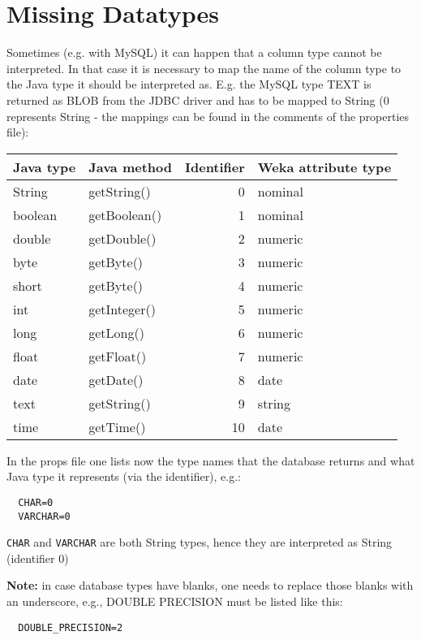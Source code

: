 \section{Missing Datatypes}
Sometimes (e.g. with MySQL) it can happen that a column type cannot be interpreted. In that case it is necessary to map the name of the column type to the Java type it should be interpreted as. E.g. the MySQL type TEXT is returned as BLOB from the JDBC driver and has to be mapped to String (0 represents String - the mappings can be found in the comments of the properties file):

\vspace{0.5cm}
\begin{tabular}{l|l|r|l}
Java type 	& Java method 	& Identifier 	& Weka attribute type \\
\hline
String		& getString() 	& 0	 	& nominal \\
boolean 	& getBoolean() 	& 1 		& nominal \\
double 		& getDouble() 	& 2 		& numeric \\
byte 		& getByte() 	& 3 		& numeric \\
short 		& getByte() 	& 4 		& numeric \\
int 		& getInteger() 	& 5 		& numeric \\
long 		& getLong() 	& 6 		& numeric \\
float 		& getFloat() 	& 7 		& numeric \\
date 		& getDate() 	& 8 		& date \\
text 		& getString() 	& 9 		& string \\
time 		& getTime() 	& 10 		& date \\
\end{tabular}
\vspace{0.5cm}

\noindent In the props file one lists now the type names that the database returns and what Java type it represents (via the identifier), e.g.:

\begin{verbatim}
  CHAR=0
  VARCHAR=0
\end{verbatim}

\noindent \texttt{CHAR} and \texttt{VARCHAR} are both String types, hence they are interpreted as String (identifier 0)

\noindent \textbf{Note:} in case database types have blanks, one needs to replace those blanks with an underscore, e.g., DOUBLE PRECISION must be listed like this:

\begin{verbatim}
  DOUBLE_PRECISION=2
\end{verbatim}


